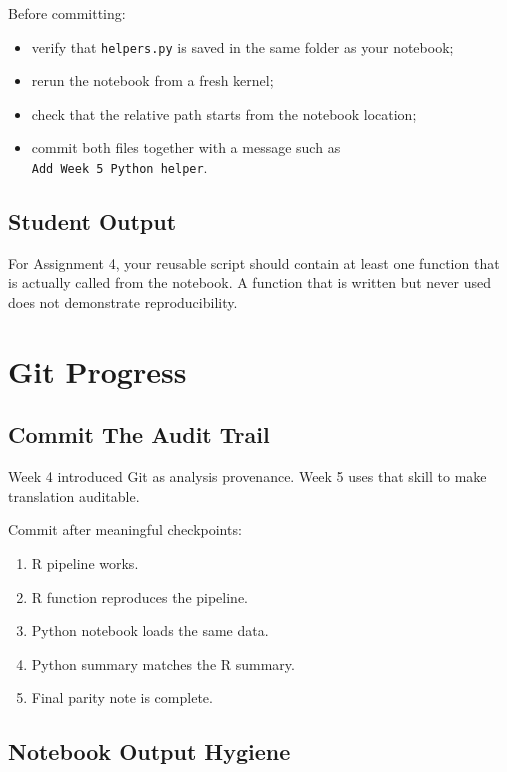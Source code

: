 \documentclass[
  letterpaper,
  DIV=11,
  numbers=noendperiod,
  oneside]{scrreprt}
\providecommand{\tightlist}{%
  \setlength{\itemsep}{0pt}\setlength{\parskip}{0pt}}
\begin{document}
Before committing:

\begin{itemize}
\tightlist
\item
  verify that \texttt{helpers.py} is saved in the same folder as your
  notebook;
\item
  rerun the notebook from a fresh kernel;
\item
  check that the relative path starts from the notebook location;
\item
  commit both files together with a message such as
  \texttt{Add\ Week\ 5\ Python\ helper}.
\end{itemize}

\section{Student Output}\label{student-output-1}

For Assignment 4, your reusable script should contain at least one
function that is actually called from the notebook. A function that is
written but never used does not demonstrate reproducibility.

\chapter{Git Progress}\label{git-progress}

\section{Commit The Audit Trail}\label{commit-the-audit-trail}

Week 4 introduced Git as analysis provenance. Week 5 uses that skill to
make translation auditable.

Commit after meaningful checkpoints:

\begin{enumerate}
\def\labelenumi{\arabic{enumi}.}
\tightlist
\item
  R pipeline works.
\item
  R function reproduces the pipeline.
\item
  Python notebook loads the same data.
\item
  Python summary matches the R summary.
\item
  Final parity note is complete.
\end{enumerate}

\section{Notebook Output Hygiene}\label{notebook-output-hygiene}
\end{document}
